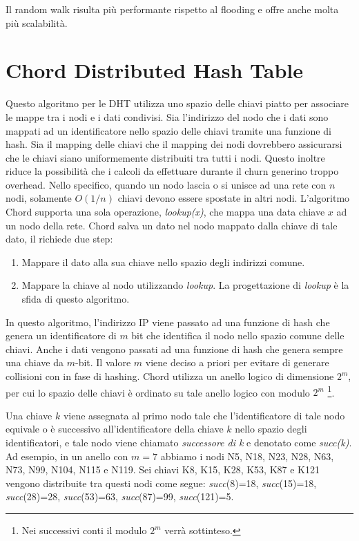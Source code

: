 Il random walk risulta più performante rispetto al flooding e offre anche molta più scalabilità.


\section{Chord Distributed Hash Table}\label{chord-distributed-hash-table}

Questo algoritmo per le DHT utilizza uno spazio delle chiavi piatto per associare le mappe tra i nodi e i dati condivisi. Sia l'indirizzo del nodo che i dati sono mappati ad un identificatore nello spazio delle chiavi tramite una funzione di hash. Sia il mapping delle chiavi che il mapping dei nodi dovrebbero assicurarsi che le chiavi siano uniformemente distribuiti tra tutti i nodi. Questo inoltre riduce la possibilità che i calcoli da effettuare durante il churn generino troppo overhead. Nello specifico, quando un nodo lascia o si unisce ad una rete con $n$ nodi, solamente $O(1/n)$ chiavi devono essere spostate in altri nodi. L'algoritmo Chord supporta una sola operazione, \emph{lookup(x)}, che mappa una data chiave $x$ ad un nodo della rete. Chord salva un dato nel nodo mappato dalla chiave di tale dato, il richiede due step:

\begin{enumerate}
\def\labelenumi{\arabic{enumi}.}
\itemsep1pt\parskip0pt
\item
  Mappare il dato alla sua chiave nello spazio degli indirizzi comune.
\item
  Mappare la chiave al nodo utilizzando \emph{lookup}. La progettazione   di \emph{lookup} è la sfida di questo algoritmo.
\end{enumerate}

In questo algoritmo, l'indirizzo IP viene passato ad una funzione di hash che genera un identificatore di $m$ bit che identifica il nodo nello spazio comune delle chiavi. Anche i dati vengono passati ad una funzione di hash che genera sempre una chiave da $m$-bit. Il valore $m$ viene deciso a priori per evitare di generare collisioni con in fase di hashing. Chord utilizza un anello logico di dimensione $2^m$, per cui lo spazio delle chiavi è ordinato su tale anello logico con modulo $2^m$ \footnote{Nei successivi conti il modulo $2^m$ verrà sottinteso.}.

Una chiave $k$ viene assegnata al primo nodo tale che l'identificatore di tale nodo equivale o è successivo all'identificatore della chiave $k$ nello spazio degli identificatori, e tale nodo viene chiamato \emph{successore di k} e denotato come \emph{succ(k)}. Ad esempio, in un anello con $m=7$ abbiamo i nodi N5, N18, N23, N28, N63, N73, N99, N104, N115 e N119. Sei chiavi K8, K15, K28, K53, K87 e K121 vengono distribuite tra questi nodi come segue: \emph{succ}(8)=18, \emph{succ}(15)=18, \emph{succ}(28)=28, \emph{succ}(53)=63, \emph{succ}(87)=99, \emph{succ}(121)=5.

